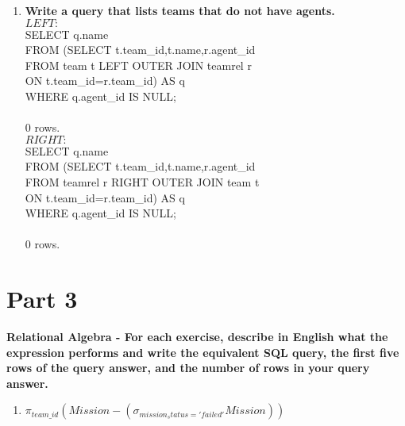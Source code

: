 \documentclass{article}
\begin{document}
\begin{enumerate}
\item
\textbf{Write a query that lists teams that do not have agents.\\}
$LEFT:$\\
SELECT q.name\\
FROM (SELECT t.team\_id,t.name,r.agent\_id\\
\hspace*{1 cm}FROM team t LEFT OUTER JOIN teamrel r\\
\hspace*{1 cm}ON t.team\_id=r.team\_id) AS q\\
\hspace*{5 cm}                        WHERE q.agent\_id IS NULL;\\
\\0 rows.\\

$RIGHT:$\\
SELECT q.name\\
FROM (SELECT t.team\_id,t.name,r.agent\_id\\
\hspace*{1 cm}FROM teamrel r RIGHT OUTER JOIN team t\\
\hspace*{1 cm}ON t.team\_id=r.team\_id) AS q\\
\hspace*{5 cm}                        WHERE q.agent\_id IS NULL;\\
\\0 rows.\\

\end{enumerate}

\section*{Part 3}
\textbf{Relational Algebra - For each exercise, describe in English what the expression performs
and write the equivalent SQL query, the first five rows of the query answer, and the number of
rows in your query answer.}
\begin{enumerate}

\item
$\pi_{team\_id}(Mission - (\sigma_{mission_status='failed'}Mission))$\\

\end{enumerate}
\end{document}

